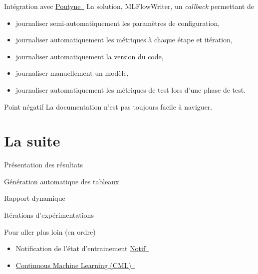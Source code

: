 \documentclass[aspectratio=169,10pt,xcolor=x11names,english,french]{beamer}
\newcommand{\link}[2]{\href{#1}{#2~{\smaller\faExternalLink*}}}
\begin{document}
	\begin{frame}{Intégration avec \link{https://poutyne.org/}{Poutyne}}
		La solution, \color{bleu}MLFlowWriter\color{couleurpolice}, un \textit{callback} permettant de
		\begin{itemize}
			\item journaliser semi-automatiquement les paramètres de configuration,
			\item journaliser automatiquement les métriques à chaque étape et itération,
			\item journaliser automatiquement la version du code,
			\item journaliser manuellement un modèle,
			\item journaliser automatiquement les métriques de test lors d'une phase de test.
		\end{itemize}
	\end{frame}

	\begin{frame}{Point négatif}
		La documentation n'est pas toujours facile à naviguer.
	\end{frame}

		
	\section{La suite}
	\begin{frame}{Présentation des résultats}
				\centering
		\begin{minipage}{0.49\linewidth}
				\centering
				\fontsize{35}{35}\faTable\vfil
				\vspace{1em}
				\normalsize Génération automatique des tableaux
		\end{minipage}
		\begin{minipage}{0.49\linewidth}
				\centering
				\fontsize{35}{35}\vfil
				\vspace{1em}
				\normalsize Rapport dynamique
		\end{minipage}
	\end{frame}
	\begin{frame}
		\centering
		\fontsize{35}{35}\faRefresh\vfil
		\vspace{1em}
		\normalsize Itérations d'expérimentations
	\end{frame}
	
	\begin{frame}{Pour aller plus loin (en ordre)}
		\begin{itemize}
			\item Notification de l'état d'entrainement \link{https://notificationdoc.ca/}{Notif}
			\item \link{https://cml.dev/}{Continuous Machine Learning (CML)} 
		\end{itemize}
	\end{frame}
	
\end{document}
